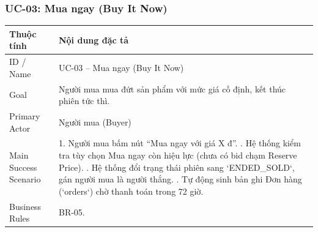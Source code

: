 \documentclass[11pt,a4paper]{article}
\begin{document}
\subsubsection{UC-03: Mua ngay (Buy It Now)}
\begin{table}[H]
    \centering
    \small
    \begin{tabularx}{\textwidth}{|l|X|}
        \hline
        \textbf{Thuộc tính} & \textbf{Nội dung đặc tả} \\ \hline
        ID / Name & UC-03 -- Mua ngay (Buy It Now) \\ \hline
        Goal & Người mua mua đứt sản phẩm với mức giá cố định, kết thúc phiên tức thì. \\ \hline
        Primary Actor & Người mua (Buyer) \\ \hline
        Main Success Scenario & 
        1. Người mua bấm nút ``Mua ngay với giá X đ''. \newline
        2. Hệ thống kiểm tra tùy chọn Mua ngay còn hiệu lực (chưa có bid chạm Reserve Price). \newline
        3. Hệ thống đổi trạng thái phiên sang `ENDED_SOLD`, gán người mua là người thắng. \newline
        4. Tự động sinh bản ghi Đơn hàng (`orders`) chờ thanh toán trong 72 giờ. \\ \hline
        Business Rules & BR-05. \\ \hline
    \end{tabularx}
\end{table}
\end{document}
